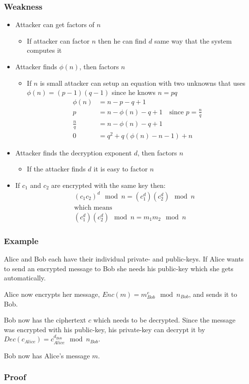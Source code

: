 \subsubsection{Weakness}
\begin{itemize}
\item Attacker can get factors of $n$
\begin{itemize}
\item If attacker can factor $n$ then he can find $d$ same way that
  the system computes it
\end{itemize}
\item Attacker finds $\phi (n)$, then factors $n$
\begin{itemize}
\item If $n$ is small attacker can setup an equation with two unknowns
  that uses $\phi (n)=(p-1)(q-1)$ since he knows $n=pq$
\begin{align*}
\phi(n) &= n - p - q + 1 \\
p &= n - \phi(n) - q + 1 \quad \text{since } p = \frac{n}{q} \\
\frac{n}{q} &= n - \phi(n) - q + 1 \\
0 &= q^2 + q(\phi(n) - n - 1) + n
\end{align*}
\end{itemize}
\item Attacker finds the decryption exponent $d$, then factors $n$
\begin{itemize}
\item If the attacker finds $d$ it is easy to factor $n$
\end{itemize}
\item If $c_1$ and $c_2$ are encrypted with the same key then:
\begin{align*}
&(c_1c_2)^d \mod n = (c_1^d) (c_2^d) \mod n \\
&\text{which means} \\
&(c_1^d) (c_2^d) \mod n = m_1m_2 \mod n
\end{align*}



\end{itemize}
\subsubsection{Example}
Alice and Bob each have their individual private- and public-keys. If
Alice wants to send an encrypted message to Bob she needs his
public-key which she gets automatically.

Alice now encrypts her message, $Enc(m)=m^e_{Bob} \mod n_{Bob}$, and
sends it to Bob.

Bob now has the ciphertext $c$ which needs to be decrypted. Since the
message was encrypted with his public-key, his private-key can decrypt
it by $Dec(c_{Alice}) = c^{d_{Bob}}_{Alice} \mod n_{Bob}$.

Bob now has Alice’s message $m$.

\subsubsection{Proof}

